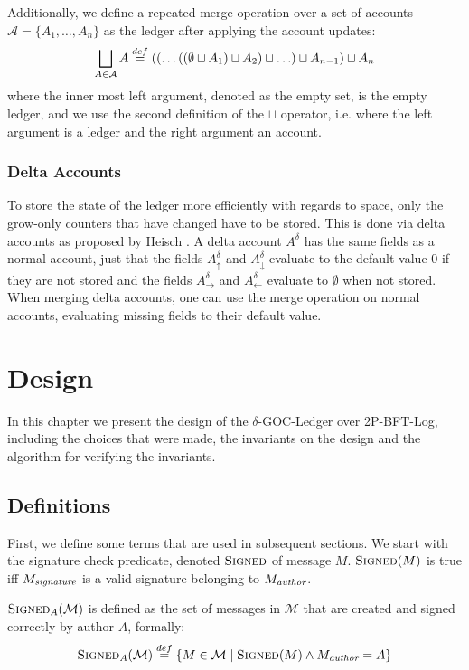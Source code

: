 Additionally, we define a repeated merge operation over a set of accounts $\mathcal A = \{A_1, \ldots, A_n\}$ as the ledger after applying the account updates:
\begin{equation}
    \label{eqn:bigsqcup}
    \bigsqcup_{A \in \mathcal A} A \stackrel{def}{=} \left(\left(\ldots\left(\left(\emptyset \sqcup A_1\right) \sqcup A_2\right) \sqcup\ldots\right)\sqcup A_{n-1}\right)\sqcup A_n
\end{equation}
where the inner most left argument, denoted as the empty set, is the empty ledger, and we use the second definition of the $\sqcup$ operator, i.e. where the left argument is a ledger and the right argument an account.


\subsection{Delta Accounts}
To store the state of the ledger more efficiently with regards to space, only the grow-only counters that have changed have to be stored. This is done via delta accounts as proposed by Heisch \cite{delta-goc-ledger-heisch}. A delta account $A^\delta$ has the same fields as a normal account, just that the fields $A^\delta_\uparrow$ and $A^\delta_\downarrow$ evaluate to the default value $0$ if they are not stored and the fields $A^\delta_\rightarrow$ and $A^\delta_\leftarrow$ evaluate to $\emptyset$ when not stored. When merging delta accounts, one can use the merge operation on normal accounts, evaluating missing fields to their default value.


\chapter{Design}
In this chapter we present the design of the $\delta$-GOC-Ledger over 2P-BFT-Log, including the choices that were made, the invariants on the design and the algorithm for verifying the invariants.

\section{Definitions}
First, we define some terms that are used in subsequent sections. We start with the signature check predicate, denoted $\textsc{Signed}$ of message $M$. $\textsc{Signed}(M)$ is true iff $M_\emph{signature}$ is a valid signature belonging to $M_\emph{author}$.

$\textsc{Signed}_A(\mathcal M)$ is defined as the set of messages in $\mathcal M$ that are created and signed correctly by author $A$, formally:
\[
    \textsc{Signed}_A(\mathcal M) \stackrel{def}{=} \{M \in \mathcal M \mid \textsc{Signed}(M) \land M_\emph{author} = A\}
\]

